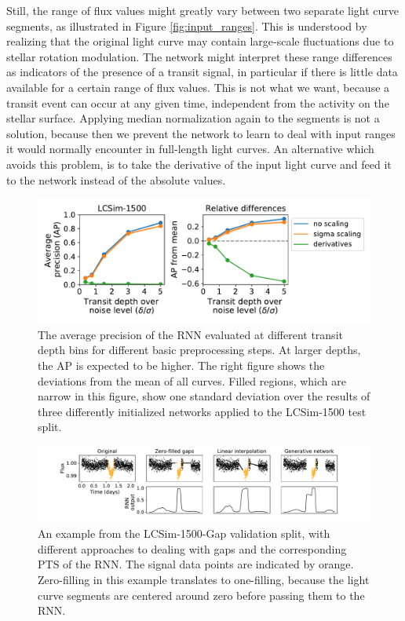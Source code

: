 Still, the range of flux values might greatly vary between two separate light curve segments, as illustrated in Figure \ref{fig:input_ranges}. This is understood by realizing that the original light curve may contain large-scale fluctuations due to stellar rotation modulation. The network might interpret these range differences as indicators of the presence of a transit signal, in particular if there is little data available for a certain range of flux values. This is not what we want, because a transit event can occur at any given time, independent from the activity on the stellar surface. Applying median normalization again to the segments is not a solution, because then we prevent the network to learn to deal with input ranges it would normally encounter in full-length light curves. An alternative which avoids this problem, is to take the derivative of the input light curve and feed it to the network instead of the absolute values.

\begin{figure}
    \centering
    \includegraphics[width=0.7\linewidth]{Experiments/Figures/Preprocessing/lcsim1500_AP_pp-basic.pdf}
    \caption{The average precision of the RNN evaluated at different transit depth bins for different basic preprocessing steps. At larger depths, the AP is expected to be higher. The right figure shows the deviations from the mean of all curves. Filled regions, which are narrow in this figure, show one standard deviation over the results of three differently initialized networks applied to the LCSim-1500 test split.}
    \label{fig:lcsim_pp_basic}
\end{figure}

\begin{figure}
    \centering
    \includegraphics[width=\linewidth]{Experiments/Figures/Preprocessing/gap_examples.pdf}
    \caption{An example from the LCSim-1500-Gap validation split, with different approaches to dealing with gaps and the corresponding PTS of the RNN. The signal data points are indicated by orange. Zero-filling in this example translates to one-filling, because the light curve segments are centered around zero before passing them to the RNN.}
    \label{fig:gap_examples}
\end{figure}

